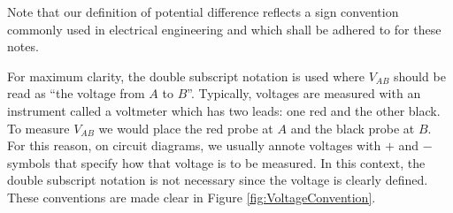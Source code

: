 \documentclass[14pt,a5paper,twoside]{book}
\begin{document}
Note that our definition of potential difference reflects a sign convention commonly used in electrical engineering and which shall be adhered to for these notes.

For maximum clarity, the double subscript notation is used where $V_{AB}$ should be read as ``the voltage from $A$ to $B$''. Typically, voltages are measured with an instrument called a voltmeter which has two leads: one red and the other black. To measure $V_{AB}$ we would place the red probe at $A$ and the black probe at $B$. For this reason, on circuit diagrams, we usually annote voltages with $+$ and $-$ symbols that specify how that voltage is to be measured. In this context, the double subscript notation is not necessary since the voltage is clearly defined. These conventions are made clear in Figure \ref{fig:VoltageConvention}.
\end{document}
